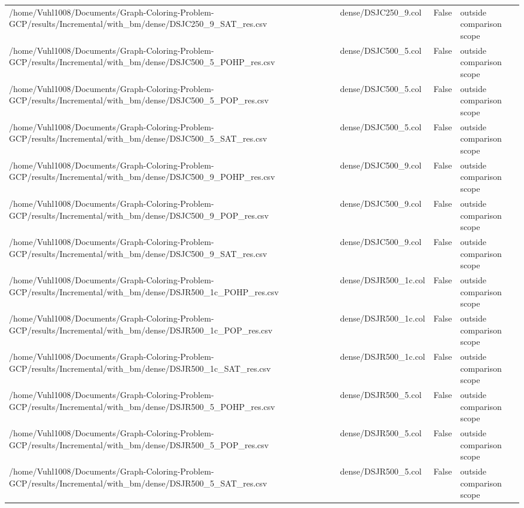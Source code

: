 \begin{table}[htbp]
\begin{tabular}{llll}
/home/Vuhl1008/Documents/Graph-Coloring-Problem-GCP/results/Incremental/with\_bm/dense/DSJC250\_9\_SAT\_res.csv & dense/DSJC250\_9.col & False & outside comparison scope \\
/home/Vuhl1008/Documents/Graph-Coloring-Problem-GCP/results/Incremental/with\_bm/dense/DSJC500\_5\_POHP\_res.csv & dense/DSJC500\_5.col & False & outside comparison scope \\
/home/Vuhl1008/Documents/Graph-Coloring-Problem-GCP/results/Incremental/with\_bm/dense/DSJC500\_5\_POP\_res.csv & dense/DSJC500\_5.col & False & outside comparison scope \\
/home/Vuhl1008/Documents/Graph-Coloring-Problem-GCP/results/Incremental/with\_bm/dense/DSJC500\_5\_SAT\_res.csv & dense/DSJC500\_5.col & False & outside comparison scope \\
/home/Vuhl1008/Documents/Graph-Coloring-Problem-GCP/results/Incremental/with\_bm/dense/DSJC500\_9\_POHP\_res.csv & dense/DSJC500\_9.col & False & outside comparison scope \\
/home/Vuhl1008/Documents/Graph-Coloring-Problem-GCP/results/Incremental/with\_bm/dense/DSJC500\_9\_POP\_res.csv & dense/DSJC500\_9.col & False & outside comparison scope \\
/home/Vuhl1008/Documents/Graph-Coloring-Problem-GCP/results/Incremental/with\_bm/dense/DSJC500\_9\_SAT\_res.csv & dense/DSJC500\_9.col & False & outside comparison scope \\
/home/Vuhl1008/Documents/Graph-Coloring-Problem-GCP/results/Incremental/with\_bm/dense/DSJR500\_1c\_POHP\_res.csv & dense/DSJR500\_1c.col & False & outside comparison scope \\
/home/Vuhl1008/Documents/Graph-Coloring-Problem-GCP/results/Incremental/with\_bm/dense/DSJR500\_1c\_POP\_res.csv & dense/DSJR500\_1c.col & False & outside comparison scope \\
/home/Vuhl1008/Documents/Graph-Coloring-Problem-GCP/results/Incremental/with\_bm/dense/DSJR500\_1c\_SAT\_res.csv & dense/DSJR500\_1c.col & False & outside comparison scope \\
/home/Vuhl1008/Documents/Graph-Coloring-Problem-GCP/results/Incremental/with\_bm/dense/DSJR500\_5\_POHP\_res.csv & dense/DSJR500\_5.col & False & outside comparison scope \\
/home/Vuhl1008/Documents/Graph-Coloring-Problem-GCP/results/Incremental/with\_bm/dense/DSJR500\_5\_POP\_res.csv & dense/DSJR500\_5.col & False & outside comparison scope \\
/home/Vuhl1008/Documents/Graph-Coloring-Problem-GCP/results/Incremental/with\_bm/dense/DSJR500\_5\_SAT\_res.csv & dense/DSJR500\_5.col & False & outside comparison scope \\

\end{tabular}
\end{table}
